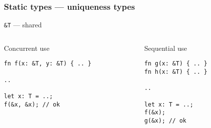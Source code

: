 \documentclass[t]{beamer}
\begin{document}
\begin{frame}[fragile]
\frametitle{Static types --- uniqueness types}

\texttt{\&T} --- shared
  
\begin{columns}

\begin{column}[T]{0.48\textwidth}
\begin{block}{Concurrent use}
\small
\begin{verbatim}
fn f(x: &T, y: &T) { .. }

..

let x: T = ..;
f(&x, &x); // ok
\end{verbatim}
\end{block}
\end{column}

\begin{column}[T]{0.48\textwidth}
\begin{block}{Sequential use}
\small
\begin{verbatim}
fn g(x: &T) { .. }
fn h(x: &T) { .. }

..

let x: T = ..;
f(&x);
g(&x); // ok
\end{verbatim}
\end{block}
\end{column}

\end{columns}

\end{frame}
\end{document}
